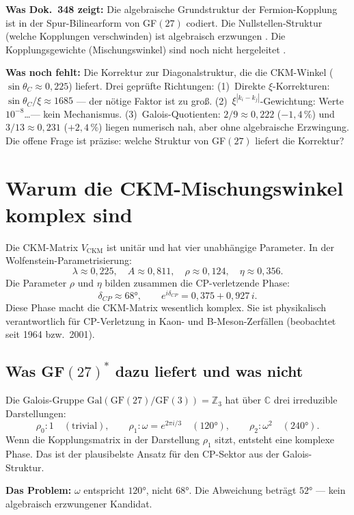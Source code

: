 \textbf{Was Dok.~348 zeigt:} Die algebraische Grundstruktur der Fermion-Kopplung
ist in der Spur-Bilinearform von GF$(27)$ codiert. Die Nullstellen-Struktur
(welche Kopplungen verschwinden) ist algebraisch erzwungen \BM. Die
Kopplungsgewichte (Mischungswinkel) sind noch nicht hergeleitet \SM.

\textbf{Was noch fehlt:} Die Korrektur zur Diagonalstruktur, die die
CKM-Winkel ($\sin\theta_C\approx0{,}225$) liefert. Drei geprüfte Richtungen:
(1)~Direkte $\xi$-Korrekturen: $\sin\theta_C/\xi\approx1685$ --- der nötige Faktor ist
zu groß. (2)~$\xi^{|k_i-k_j|}$-Gewichtung: Werte $10^{-8}$\ldots --- kein Mechanismus.
(3)~Galois-Quotienten: $2/9\approx0{,}222$ ($-1{,}4\,\%$) und $3/13\approx0{,}231$
($+2{,}4\,\%$) liegen numerisch nah, aber ohne algebraische Erzwingung.
Die offene Frage ist präzise: welche Struktur von GF$(27)$ liefert die
Korrektur? \SM


\section{Warum die CKM-Mischungswinkel komplex sind}

Die CKM-Matrix $V_\mathrm{CKM}$ ist unitär und hat vier unabhängige Parameter.
In der Wolfenstein-Parametrisierung:
\[
  \lambda \approx 0{,}225,\quad A \approx 0{,}811,\quad
  \rho \approx 0{,}124,\quad \eta \approx 0{,}356.
\]
Die Parameter $\rho$ und $\eta$ bilden zusammen die CP-verletzende Phase:
\[
  \delta_{CP} \approx 68°,\qquad
  e^{i\delta_{CP}} = 0{,}375 + 0{,}927\,i.
\]
Diese Phase macht die CKM-Matrix wesentlich komplex. Sie ist physikalisch
verantwortlich für CP-Verletzung in Kaon- und B-Meson-Zerfällen
(beobachtet seit 1964 bzw.\ 2001).

\subsection{Was GF$(27)^*$ dazu liefert und was nicht}

Die Galois-Gruppe $\mathrm{Gal}(\mathrm{GF}(27)/\mathrm{GF}(3)) = \mathbb{Z}_3$
hat über $\mathbb{C}$ drei irreduzible Darstellungen:
\[
  \rho_0: 1 \quad (\text{trivial}),\qquad
  \rho_1: \omega = e^{2\pi i/3} \quad (120°),\qquad
  \rho_2: \omega^2 \quad (240°).
\]
Wenn die Kopplungsmatrix in der Darstellung $\rho_1$ sitzt, entsteht eine
komplexe Phase. Das ist der plausibelste Ansatz für den CP-Sektor aus der
Galois-Struktur.

\textbf{Das Problem:} $\omega$ entspricht $120°$, nicht $68°$.
Die Abweichung beträgt $52°$ --- kein algebraisch erzwungener Kandidat.

